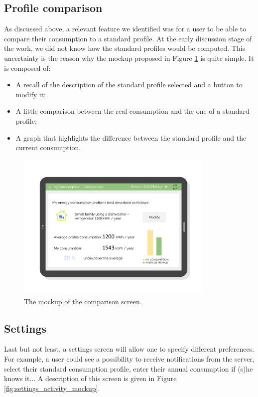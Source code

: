 \documentclass[a4paper, oneside, 11pt]{book}
\begin{document}
\subsection{Profile comparison}
As discussed above, a relevant feature we identified was for a user to be able to compare their consumption to a standard profile. At the early discussion stage of the work, we did not know how the standard profiles would be computed. This uncertainty is the reason why the mockup proposed in Figure \ref{fig:comparison_activity_mockup} is quite simple. It is composed of:
\begin{itemize}
	\item A recall of the description of the standard profile selected and a button to modify it;
	\item A little comparison between the real consumption and the one of a standard profile;
	\item A graph that highlights the difference between the standard profile and the current consumption.
\end{itemize}

\begin{figure}[htbp]
	\centerline{\includegraphics[width=0.85\textwidth]{comparison_activity_mockup.pdf}}
	\caption{The mockup of the comparison screen.}
	\label{fig:comparison_activity_mockup}
\end{figure}

\subsection{Settings}
Last but not least, a settings screen will allow one to specify different preferences. For example, a user could see a possibility to receive notifications from the server, select their standard consumption profile, enter their annual consumption if (s)he knows it... A description of this screen is given in Figure \ref{fig:settings_activity_mockup}.
\end{document}
